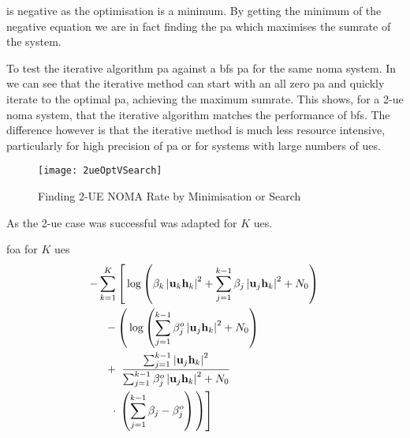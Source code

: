 \par
{} is negative as the optimisation is a minimum.
By getting the minimum of the negative equation we are in fact finding the \ac{pa} which maximises the sumrate of the system.

\par
To test the iterative algorithm \ac{pa} against a \ac{bfs} \ac{pa} for the same \ac{noma} system.
In  we can see that the iterative method can start with an all zero \ac{pa} and quickly iterate to the optimal \ac{pa}, achieving the maximum sumrate.
This shows, for a 2-\ac{ue} \ac{noma} system, that the iterative algorithm matches the performance of \ac{bfs}.
The difference however is that the iterative method is much less resource intensive, particularly for high precision of \ac{pa} or for systems with large numbers of \acp{ue}.

\begin{figure}[htb!]
	\centering
	\texttt{[image: 2ueOptVSearch]}
	\caption{Finding 2-UE NOMA Rate by Minimisation or Search}
	\label{fig:2ueOptVSearch}
\end{figure}

\par
As the 2-\ac{ue} case was successful  was adapted for $K$ \acp{ue}.

\ac{foa} for $K$ \acp{ue}
\begin{equation}
	\begin{aligned}
		- \sum^K_{k=1}
		& \left[
			\vphantom{
			\frac{\sum^{k-1}_{j=1} \left| \mb{u}_j \mb{h}_k \right|^2}
			{\sum^{k-1}_{j=1} \beta^o_j \left| \mb{u}_j \mb{h}_k \right|^2 + N_0}
			}
			\log
			\left(
				\beta_k \left| \mb{u}_k \mb{h}_k \right|^2
				+ \sum^{k-1}_{j=1} \beta_j \left| \mb{u}_j \mb{h}_k \right|^2
				+ N_0
			\right) \right. \\
			-
			& \left(
				\vphantom{
				\frac{\sum^{k-1}_{j=1} \left| \mb{u}_j \mb{h}_k \right|^2}
				{\sum^{k-1}_{j=1} \beta^o_j \left| \mb{u}_j \mb{h}_k \right|^2 + N_0}
				}
				\log
				\left(
					\sum^{k-1}_{j=1} \beta^o_j \left| \mb{u}_j \mb{h}_k \right|^2
					+ N_0
				\right)
			\right.\\
			+ &\enspace \frac{\sum^{k-1}_{j=1} \left| \mb{u}_j \mb{h}_k \right|^2}
				{\sum^{k-1}_{j=1} \beta^o_j \left| \mb{u}_j \mb{h}_k \right|^2 + N_0} \\
			 \cdot & \left. \left.
			 \left(
				\sum^{k-1}_{j=1} \beta_j - \beta^o_j
			 \right)
		\vphantom{
		\frac{\sum^{k-1}_{j=1} \left| \mb{u}_j \mb{h}_k \right|^2}
		{\sum^{k-1}_{j=1} \beta^o_j \left| \mb{u}_j \mb{h}_k \right|^2 + N_0}
		}
		\right) \right]
	\end{aligned}
	\label{eq:foagen}
\end{equation}

